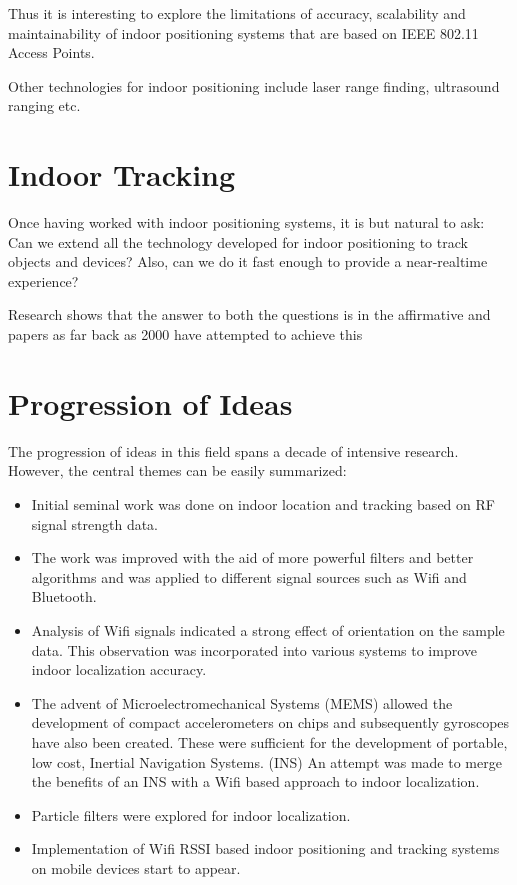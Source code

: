 Thus it is interesting to explore the limitations of accuracy, scalability and
maintainability of indoor positioning systems that are based on IEEE 802.11
Access Points.

Other technologies for indoor positioning include laser range finding, 
ultrasound ranging etc. %

\section{Indoor Tracking}

Once having worked with indoor positioning systems, it is but natural to ask:
Can we extend all the technology developed for indoor positioning to track 
objects and devices? Also, can we do it fast enough to provide a near-realtime
experience?

Research shows that the answer to both the questions is in the affirmative
and papers as far back as 2000 \cite{RADAR} have attempted to achieve this 

\section{Progression of Ideas}

The progression of ideas in this field spans a decade of intensive research. 
However, the central themes can be easily summarized:

\begin{itemize}
\item Initial seminal work was done on indoor location and tracking based on RF signal strength data.\cite{RADAR}
\item The work was improved with the aid of more powerful filters and better algorithms and was applied to different signal sources such as Wifi and Bluetooth.\cite{Kotanen}\cite{SpotON}
\item Analysis of Wifi signals indicated a strong effect of orientation on the sample data. This observation was incorporated into various systems to improve indoor localization accuracy.\cite{Ladd}\cite{King}
\item The advent of Microelectromechanical Systems (MEMS) allowed the development of compact accelerometers on chips and subsequently gyroscopes have also been created. These were sufficient for the development of portable, low cost, Inertial Navigation Systems. (INS) An attempt was made to merge the benefits of an INS with a Wifi based approach to indoor localization.\cite{Evennou}\cite{Wang}
\item Particle filters were explored for indoor localization.\cite{Arulampalam}\cite{Ristic}\cite{Widyawan}
\item Implementation of Wifi RSSI based indoor positioning and tracking systems on mobile devices start to appear.\cite{Redpin}
\end{itemize}


